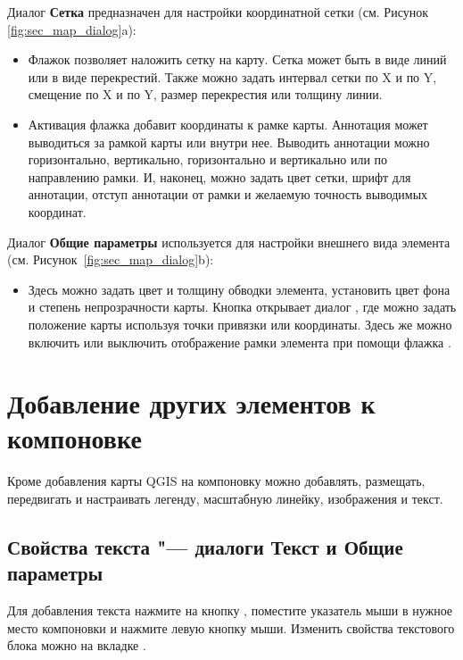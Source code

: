 
Диалог \textbf{Сетка} предназначен для настройки координатной сетки
(см. Рисунок \ref{fig:sec_map_dialog}a):

\begin{itemize}[label=--]
\item Флажок  позволяет наложить сетку на
карту. Сетка может быть в виде линий или в виде перекрестий. Также
можно задать интервал сетки по X и по Y, смещение по X и по Y, размер
перекрестия или толщину линии.
\item Активация флажка  добавит
координаты к рамке карты. Аннотация может выводиться за рамкой карты или
внутри нее. Выводить аннотации можно горизонтально, вертикально,
горизонтально и вертикально или по направлению рамки. И, наконец, можно
задать цвет сетки, шрифт для аннотации, отступ аннотации от рамки и
желаемую точность выводимых координат.
\end{itemize}


Диалог \textbf{Общие параметры} используется для настройки внешнего
вида элемента (см. Рисунок~\ref{fig:sec_map_dialog}b):

\begin{itemize}[label=--]
\item Здесь можно задать цвет и толщину обводки элемента, установить цвет
фона и степень непрозрачности карты. Кнопка  открывает
диалог , где можно задать положение карты
используя точки привязки или координаты. Здесь же можно включить или
выключить отображение рамки элемента при помощи флажка
.
\end{itemize}

\section{Добавление других элементов к компоновке}

Кроме добавления карты QGIS на компоновку можно добавлять, размещать,
передвигать и настраивать легенду, масштабную линейку, изображения и
текст.

\subsection{Свойства текста "--- диалоги Текст и Общие параметры}

Для добавления текста нажмите на кнопку
, поместите указатель мыши в
нужное место компоновки и нажмите левую кнопку мыши. Изменить свойства
текстового блока можно на вкладке .

